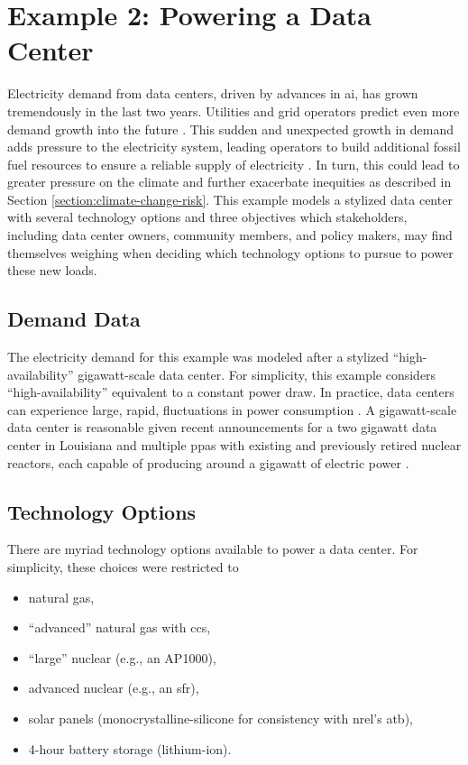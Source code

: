 \section{Example 2: Powering a Data Center}

Electricity demand from data centers, driven by advances in \ac{ai}, has grown
tremendously in the last two years. Utilities and grid operators predict even
more demand growth into the future
\cite{pjm_resource_adequacy_planning_department_2024_2024,miso_long-term_2024,davenport_generational_2024}.
This sudden and unexpected growth in demand adds pressure to the electricity
system, leading operators to build additional fossil fuel resources to ensure a
reliable supply of electricity \cite{howland_ethan_pjm_2025}. In turn, this
could lead to greater pressure on the climate and further exacerbate inequities
as described in Section \ref{section:climate-change-risk}. This example models a
stylized data center with several technology options and three objectives which
stakeholders, including data center owners, community members, and policy
makers, may find themselves weighing when deciding which technology options to
pursue to power these new loads.

\subsection{Demand Data}
The electricity demand for this example was modeled after a stylized
``high-availability'' gigawatt-scale data center. For simplicity, this example
considers ``high-availability'' equivalent to a constant power draw. In
practice, data centers can experience large, rapid, fluctuations in power
consumption \cite{quint_practical_2025}. A gigawatt-scale data center is
reasonable given recent announcements for a two gigawatt data center in
Louisiana \cite{swinhoe_meta_2024} and multiple \acp{ppa} with existing and
previously retired nuclear reactors, each capable of producing around a gigawatt
of electric power
\cite{shaw_microsoft_2024,constellation_energy_constellation_2025}.

\subsection{Technology Options}
There are myriad technology options available to power a data center. For
simplicity, these choices were restricted to 
\begin{itemize}
    \item natural gas,
    \item ``advanced'' natural gas with \ac{ccs},
    \item ``large'' nuclear (e.g., an AP1000),
    \item advanced nuclear (e.g., an \ac{sfr}),
    \item solar panels (monocrystalline-silicone for consistency with
    \ac{nrel}'s \ac{atb}),
    \item 4-hour battery storage (lithium-ion).
\end{itemize}

